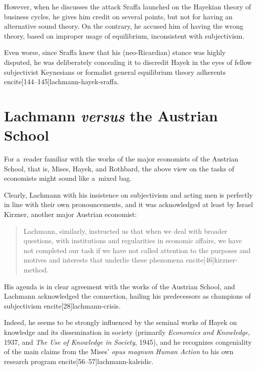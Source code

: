 {However, when he discusses the attack Sraffa launched on the Hayekian theory of business cycles, he gives him credit on several points, but not for having an alternative sound theory. On the contrary, he accused him of having the wrong theory, based on improper usage of equilibrium, inconsistent with subjectivism.

Even worse, since Sraffa knew that his (neo-Ricardian) stance was highly disputed, he was deliberately concealing it to discredit Hayek in the eyes of fellow subjectivist Keynesians or formalist general equilibrium theory adherents encite[144--145]{lachmann-hayek-sraffa}.



\section{Lachmann \emph{versus} the Austrian School}



For a~reader familiar with the works of the major economists of the Austrian School, that is, Mises, Hayek, and Rothbard, the above view on the tasks of economists might sound like a~mixed bag.

Clearly, Lachmann with his insistence on subjectivism and acting men is perfectly in line with their own pronouncements, and it was acknowledged at least by Israel Kirzner, another major Austrian economist:

\begin{quote}

Lachmann, similarly, instructed us that when we deal with broader questions, with institutions and regularities in economic affairs, we have not completed our task if we have not called attention to the purposes and motives and interests that underlie these phenomena encite[46]{kirzner-method}.

\end{quote}

His agenda is in clear agreement with the works of the Austrian School, and Lachmann acknowledged the connection, hailing his predecessors as champions of subjectivism encite[28]{lachmann-crisis}.

Indeed, he seems to be strongly influenced by the seminal works of Hayek on knowledge and its dissemination in society (primarily \emph{Economics and Knowledge}, 1937, and \emph{The Use of Knowledge in Society}, 1945), and he recognizes congeniality of the main claims from the Mises' \emph{opus magnum} \emph{Human Action} to his own research program encite[56--57]{lachmann-kaleidic}.



}
